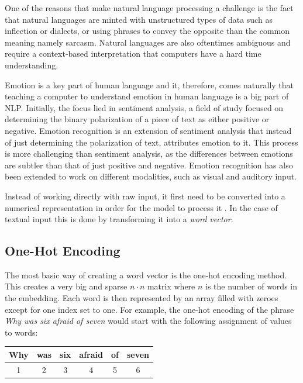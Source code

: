 \documentclass[nofilelist]{cslthse-msc}
\begin{document}
One of the reasons that make natural language processing a challenge is the fact that natural languages are minted with unstructured types of data such as inflection or dialects, or using phrases to convey the opposite than the common meaning namely sarcasm. Natural languages are also oftentimes ambiguous and require a context-based interpretation that computers have a hard time understanding. 


Emotion is a key part of human language and it, therefore, comes naturally that teaching a computer to understand emotion in human language is a big part of NLP. Initially, the focus lied in sentiment analysis, a field of study focused on determining the binary polarization of a piece of text as either positive or negative. 
Emotion recognition is an extension of sentiment analysis that instead of just determining the polarization of text, attributes emotion to it. This process is more challenging than sentiment analysis, as the differences between emotions are subtler than that of just positive and negative. 
Emotion recognition has also been extended to work on different modalities, such as visual and auditory input.

Instead of working directly with raw input, it first need to be converted into a numerical representation in order for the model to process it \citep{franoischollet2017learning}. In the case of textual input this is done by transforming it into a \textit{word vector}.



\subsection{One-Hot Encoding}
The most basic way of creating a word vector is the one-hot encoding method. This creates a very big and sparse $n \cdot n$ matrix where $n$ is the number of words in the embedding. Each word is then represented by an array filled with zeroes except for one index set to one. For example, the one-hot encoding of the phrase \textit{Why was six afraid of seven} would start with the following assignment of values to words:

\begin{center}
    \begin{tabular}{c|c|c|c|c|c}
    
         Why & was & six & afraid & of & seven \\
         \hline
         1 & 2 & 3 & 4 & 5 & 6 \\
    \end{tabular}
\end{center}
\end{document}
